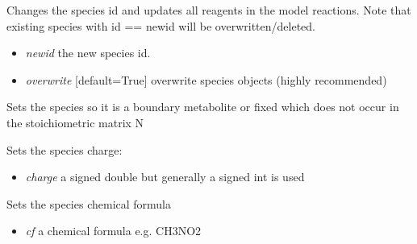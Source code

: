 \documentclass[a4paper,11pt,english]{sphinxmanual}
\begin{document}
\begin{fulllineitems}
\begin{fulllineitems}
\end{fulllineitems}


\begin{fulllineitems}
\label{modules_doc:cbmpy.CBModel.Species.rename}
Changes the species id and updates all reagents in the model reactions. Note that existing species with id == newid
will be overwritten/deleted.
\begin{itemize}
\item {} 
\emph{newid} the new species id.

\item {} 
\emph{overwrite} {[}default=True{]} overwrite species objects (highly recommended)

\end{itemize}

\end{fulllineitems}


\begin{fulllineitems}
\label{modules_doc:cbmpy.CBModel.Species.setBoundary}
Sets the species so it is a boundary metabolite or fixed which does not occur in the stoichiometric matrix N

\end{fulllineitems}


\begin{fulllineitems}
\label{modules_doc:cbmpy.CBModel.Species.setCharge}
Sets the species charge:
\begin{itemize}
\item {} 
\emph{charge} a signed double but generally a signed int is used

\end{itemize}

\end{fulllineitems}


\begin{fulllineitems}
\label{modules_doc:cbmpy.CBModel.Species.setChemFormula}
Sets the species chemical formula
\begin{itemize}
\item {} 
\emph{cf} a chemical formula e.g. CH3NO2


\end{itemize}
\end{fulllineitems}
\end{fulllineitems}
\end{document}
